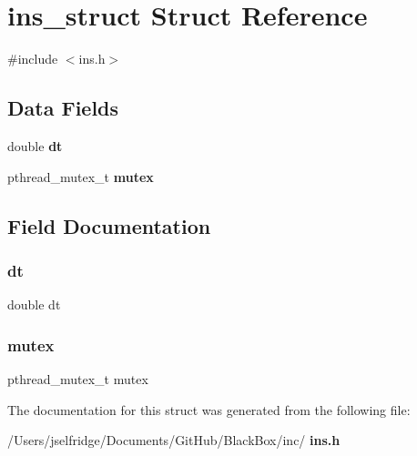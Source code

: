 \section{ins\+\_\+struct Struct Reference}
\label{structins__struct}


{\ttfamily \#include $<$ins.\+h$>$}

\subsection*{Data Fields}
\begin{DoxyCompactItemize}
\item 
double \textbf{ dt}
\item 
pthread\+\_\+mutex\+\_\+t \textbf{ mutex}
\end{DoxyCompactItemize}


\subsection{Field Documentation}
\mbox{\label{structins__struct_a03e28be41881b703c836edbfe9b51b17}} 
\subsubsection{dt}
{\footnotesize\ttfamily double dt}

\mbox{\label{structins__struct_a4acff8232e4aec9cd5c6dc200ac55ef3}} 
\subsubsection{mutex}
{\footnotesize\ttfamily pthread\+\_\+mutex\+\_\+t mutex}



The documentation for this struct was generated from the following file\+:\begin{DoxyCompactItemize}
\item 
/\+Users/jselfridge/\+Documents/\+Git\+Hub/\+Black\+Box/inc/\textbf{ ins.\+h}\end{DoxyCompactItemize}
